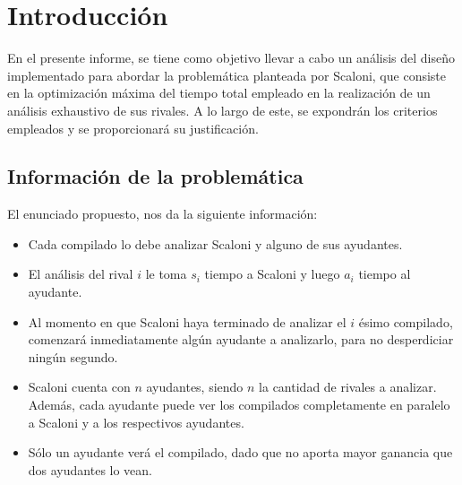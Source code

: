 \section{Introducción}

En el presente informe, se tiene como objetivo llevar a cabo un análisis del diseño 
implementado para abordar la problemática planteada por Scaloni, que consiste en la 
optimización máxima del tiempo total empleado en la realización de un análisis exhaustivo 
de sus rivales. A lo largo de este, se expondrán los criterios empleados y se proporcionará 
su justificación.


\subsection{Información de la problemática}

El enunciado propuesto, nos da la siguiente información:

\begin{itemize}

    \item Cada compilado lo debe analizar Scaloni y alguno de sus ayudantes.

    \item El análisis del rival $i$ le toma $s_i$ tiempo a Scaloni y luego $a_i$ tiempo al ayudante.
    
    \item Al momento en que Scaloni haya terminado de analizar el $i$ ésimo compilado, comenzará
    inmediatamente algún ayudante a analizarlo, para no desperdiciar ningún segundo.

    \item Scaloni cuenta con $n$ ayudantes, siendo $n$ la cantidad de rivales a analizar. Además, cada
    ayudante puede ver los compilados completamente en paralelo a Scaloni y a los respectivos ayudantes.

    \item Sólo un ayudante verá el compilado, dado que no aporta mayor ganancia que dos ayudantes lo vean.

\end{itemize}
